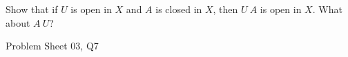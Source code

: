 \begin{samepage}
\begin{ex}
Show that if $U$ is open in $X$ and $A$ is closed in $X$, then $U \ A$ is open in $X$. What about $A \ U$?
\end{ex}
\begin{source}
Problem Sheet 03, Q7
\end{source}
\end{samepage}
